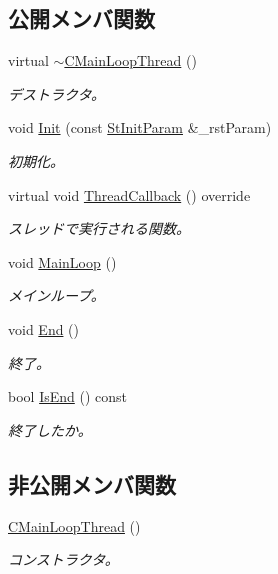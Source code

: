 \subsection*{公開メンバ関数}
\begin{DoxyCompactItemize}
\item 
virtual \hyperlink{class_c_main_loop_thread_a8f0e8741ac849daa6d0d7ef5a8e01dc0}{$\sim$\+C\+Main\+Loop\+Thread} ()
\begin{DoxyCompactList}\small\item\em デストラクタ。 \end{DoxyCompactList}\item 
void \hyperlink{class_c_main_loop_thread_a69fc8cd33bcabd841a7c73bdd6b2d80d}{Init} (const \hyperlink{struct_c_main_loop_thread_1_1_st_init_param}{St\+Init\+Param} \&\+\_\+rst\+Param)
\begin{DoxyCompactList}\small\item\em 初期化。 \end{DoxyCompactList}\item 
virtual void \hyperlink{class_c_main_loop_thread_a1c3387e62037679993c269d0a3d8daf4}{Thread\+Callback} () override
\begin{DoxyCompactList}\small\item\em スレッドで実行される関数。 \end{DoxyCompactList}\item 
void \hyperlink{class_c_main_loop_thread_a2dc58ab2dd1d0672d7cc3b19ec18f12d}{Main\+Loop} ()
\begin{DoxyCompactList}\small\item\em メインループ。 \end{DoxyCompactList}\item 
void \hyperlink{class_c_main_loop_thread_a7b744d3b869bfb14d66858d070804440}{End} ()
\begin{DoxyCompactList}\small\item\em 終了。 \end{DoxyCompactList}\item 
bool \hyperlink{class_c_main_loop_thread_a358679c3ea651efa39bfe6b9d74c4f7c}{Is\+End} () const 
\begin{DoxyCompactList}\small\item\em 終了したか。 \end{DoxyCompactList}\end{DoxyCompactItemize}
\subsection*{非公開メンバ関数}
\begin{DoxyCompactItemize}
\item 
\hyperlink{class_c_main_loop_thread_aa9cb78870f35c784845d511cfdadbc7d}{C\+Main\+Loop\+Thread} ()
\begin{DoxyCompactList}\small\item\em コンストラクタ。 \end{DoxyCompactList}\end{DoxyCompactItemize}
